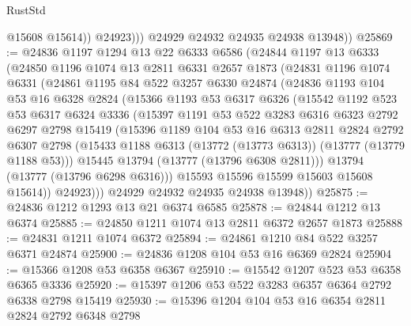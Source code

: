 \begin{lexlean}{RustStd}
\begin{coremodule}
                  @15608
                  @15614))
              @24923)))
        @24929
        @24932
        @24935
        @24938
        @13948))
@25869 := @24836
    @1197
    @1294
    @13
    @22
    @6333
    @6586
    (@24844
      @1197
      @13
      @6333
      (@24850
        @1196
        @1074
        @13
        @2811
        @6331
        @2657
        @1873
        (@24831
          @1196
          @1074
          @6331
          (@24861
            @1195
            @84
            @522
            @3257
            @6330
            @24874
            (@24836
              @1193
              @104
              @53
              @16
              @6328
              @2824
              (@15366
                @1193
                @53
                @6317
                @6326
                (@15542
                  @1192
                  @523
                  @53
                  @6317
                  @6324
                  @3336
                  (@15397
                    @1191
                    @53
                    @522
                    @3283
                    @6316
                    @6323
                    @2792
                    @6297
                    @2798
                    @15419
                    (@15396
                      @1189
                      @104
                      @53
                      @16
                      @6313
                      @2811
                      @2824
                      @2792
                      @6307
                      @2798
                      (@15433 @1188 @6313 (@13772 (@13773 @6313)) (@13777 (@13779 @1188 @53)))
                      @15445
                      @13794
                      (@13777 (@13796 @6308 @2811)))
                    @13794
                    (@13777 (@13796 @6298 @6316)))
                  @15593
                  @15596
                  @15599
                  @15603
                  @15608
                  @15614))
              @24923)))
        @24929
        @24932
        @24935
        @24938
        @13948))
@25875 := @24836 @1212 @1293 @13 @21 @6374 @6585
@25878 := @24844 @1212 @13 @6374
@25885 := @24850 @1211 @1074 @13 @2811 @6372 @2657 @1873
@25888 := @24831 @1211 @1074 @6372
@25894 := @24861 @1210 @84 @522 @3257 @6371 @24874
@25900 := @24836 @1208 @104 @53 @16 @6369 @2824
@25904 := @15366 @1208 @53 @6358 @6367
@25910 := @15542 @1207 @523 @53 @6358 @6365 @3336
@25920 := @15397 @1206 @53 @522 @3283 @6357 @6364 @2792 @6338 @2798 @15419
@25930 := @15396 @1204 @104 @53 @16 @6354 @2811 @2824 @2792 @6348 @2798

\end{coremodule}
\end{lexlean}
